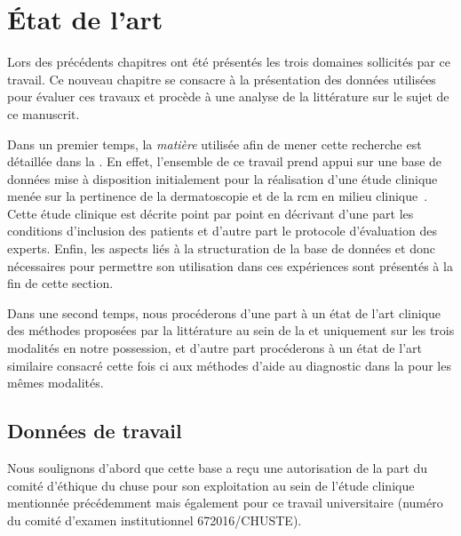 \chapter{État de l'art}
\label{chap:chapter_31}
\chapterintro
Lors des précédents chapitres ont été présentés les trois domaines sollicités par ce travail. Ce nouveau chapitre se consacre à la présentation des données utilisées pour évaluer ces travaux et procède à une analyse de la littérature sur le sujet de ce manuscrit.\par

Dans un premier temps, la \textit{matière} utilisée afin de mener cette recherche est détaillée dans la . En effet, l'ensemble de ce travail prend appui sur une base de données mise à disposition initialement pour la réalisation d'une étude clinique menée sur la pertinence de la dermatoscopie et de la \acrlong{rcm} en milieu clinique~\cite{Cinotti2018}. Cette étude clinique est décrite point par point en décrivant d'une part les conditions d'inclusion des patients et d'autre part le protocole d'évaluation des experts. Enfin, les aspects liés à la structuration de la base de données et donc nécessaires pour permettre son utilisation dans ces expériences sont présentés à la fin de cette section.\par

Dans une second temps, nous procéderons d'une part à un état de l'art clinique des méthodes proposées par la littérature au sein de la  et uniquement sur les trois modalités en notre possession, et d'autre part procéderons à un état de l'art similaire consacré cette fois ci aux méthodes d'aide au diagnostic dans la  pour les mêmes modalités.\par
\newpage

\section{Données de travail}
\label{sec:clinical_data}
Nous soulignons d'abord que cette base a reçu une autorisation de la part du comité d'éthique du \gls{chuse} pour son exploitation au sein de l'étude clinique mentionnée précédemment mais également pour ce travail universitaire (numéro du comité d'examen institutionnel 672016/CHUSTE).\par

